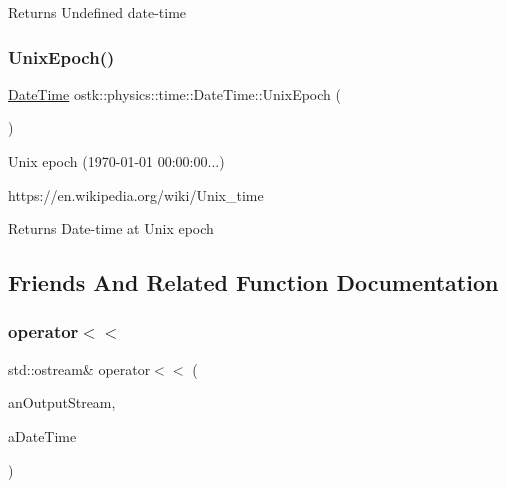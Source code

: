 \begin{DoxyReturn}{Returns}
Undefined date-\/time 
\end{DoxyReturn}
\mbox{\label{classostk_1_1physics_1_1time_1_1_date_time_a3f3b2cb5f50eb5fe0df9840c2563f8f7}} 
\subsubsection{\texorpdfstring{Unix\+Epoch()}{UnixEpoch()}}
{\footnotesize\ttfamily \hyperlink{classostk_1_1physics_1_1time_1_1_date_time}{Date\+Time} ostk\+::physics\+::time\+::\+Date\+Time\+::\+Unix\+Epoch (\begin{DoxyParamCaption}{ }\end{DoxyParamCaption})\hspace{0.3cm}{\ttfamily [static]}}



Unix epoch (1970-\/01-\/01 00\+:00\+:00...) 

https\+://en.wikipedia.\+org/wiki/\+Unix\+\_\+time

\begin{DoxyReturn}{Returns}
Date-\/time at Unix epoch 
\end{DoxyReturn}


\subsection{Friends And Related Function Documentation}
\mbox{\label{classostk_1_1physics_1_1time_1_1_date_time_afd7a10118810d4133db2044ddbb7e001}} 
\subsubsection{\texorpdfstring{operator$<$$<$}{operator<<}}
{\footnotesize\ttfamily std\+::ostream\& operator$<$$<$ (\begin{DoxyParamCaption}\item[{std\+::ostream \&}]{an\+Output\+Stream,  }\item[{const \hyperlink{classostk_1_1physics_1_1time_1_1_date_time}{Date\+Time} \&}]{a\+Date\+Time }\end{DoxyParamCaption})\hspace{0.3cm}{\ttfamily [friend]}}



